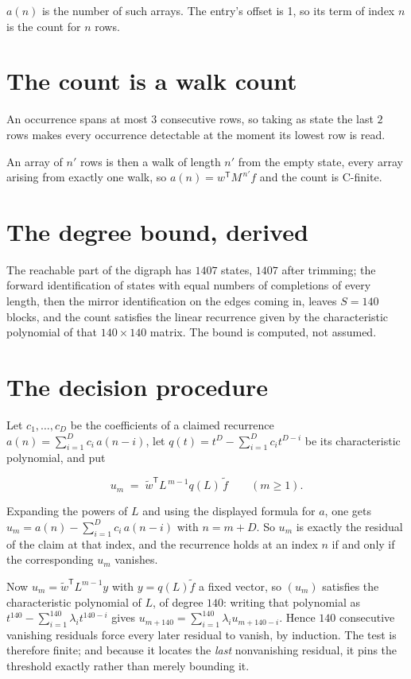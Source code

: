 \documentclass[11pt]{article}
\theoremstyle{definition}
\begin{document}
$a(n)$ is the number of such arrays. The entry's offset is 1, so its term of index $n$ is the count for $n$ rows.

\section{The count is a walk count}

An occurrence spans at most $3$ consecutive rows, so taking as state the last $2$ rows makes every occurrence detectable at the moment its lowest row is read.

An array of $n'$ rows is then a walk of length $n'$ from the empty state, every array arising from exactly one walk, so $a(n) = w^{\mathsf T}M^{\,n'}f$ and the count is C-finite.

\section{The degree bound, derived}

The reachable part of the digraph has $1407$ states, $1407$ after trimming; the forward identification of states with equal numbers of completions of every length, then the mirror identification on the edges coming in, leaves $S = 140$ blocks, and the count satisfies the linear recurrence given by the characteristic polynomial of that $140\times140$ matrix. The bound is computed, not assumed.

\section{The decision procedure}

Let $c_1,\dots,c_D$ be the coefficients of a claimed recurrence $a(n) = \sum_{i=1}^{D} c_i\,a(n-i)$, let $q(t) = t^{D} - \sum_{i=1}^{D} c_i t^{D-i}$ be its characteristic polynomial, and put

\[u_m \;=\; \tilde w^{\mathsf T} L^{\,m-1} q(L)\,\tilde f \qquad (m \ge 1).\]

Expanding the powers of $L$ and using the displayed formula for $a$, one gets $u_m = a(n) - \sum_{i=1}^{D} c_i\,a(n-i)$ with $n = m + D$. So $u_m$ is exactly the residual of the claim at that index, and the recurrence holds at an index $n$ if and only if the corresponding $u_m$ vanishes.

Now $u_m = \tilde w^{\mathsf T} L^{m-1} y$ with $y = q(L)\tilde f$ a fixed vector, so $(u_m)$ satisfies the characteristic polynomial of $L$, of degree $140$: writing that polynomial as $t^{140} - \sum_{i=1}^{140} \lambda_i t^{140-i}$ gives $u_{m+140} = \sum_{i=1}^{140} \lambda_i u_{m+140-i}$. Hence $140$ consecutive vanishing residuals force every later residual to vanish, by induction. The test is therefore finite; and because it locates the {\itshape last} nonvanishing residual, it pins the threshold exactly rather than merely bounding it.
\end{document}
